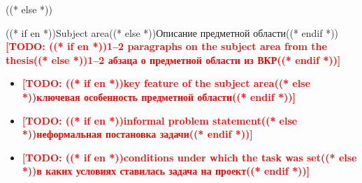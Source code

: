 \documentclass[aspectratio=169, 14pt]{beamer}
\newcommand{\todo}[1]{\textcolor{red}{\textbf{[TODO: #1]}}}
\begin{document}
((* else *))

\begin{frame}{((* if en *))Subject area((* else *))Описание предметной области((* endif *))}
  \todo{((* if en *))1--2 paragraphs on the subject area from the thesis((* else *))1--2 абзаца о предметной области из ВКР((* endif *))}

  \vspace{0.4em}
  \begin{itemize}
    \item \todo{((* if en *))key feature of the subject area((* else *))ключевая особенность предметной области((* endif *))}
    \item \todo{((* if en *))informal problem statement((* else *))неформальная постановка задачи((* endif *))}
    \item \todo{((* if en *))conditions under which the task was set((* else *))в каких условиях ставилась задача на проект((* endif *))}
  \end{itemize}
\end{frame}
\end{document}
